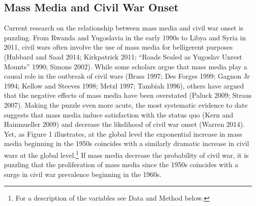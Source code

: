 \documentclass[12pt,article,oneside]{memoir}
\author{}
\date{}
\begin{document}
  
\setsansfont[Mapping=tex-text]{Gill Sans} 
\setmonofont[Mapping=tex-text,Scale=0.8]{Consolas}
\pagestyle{kjh}

\begin{centering}

\section{Mass Media and Civil War Onset}

\end{centering}

\vspace{2em}

\doublespacing

Current research on the relationship between mass media and civil war
onset is puzzling. From Rwanda and Yugoslavia in the early 1990s to
Libya and Syria in 2011, civil wars often involve the use of mass media
for belligerent purposes (Hubbard and Saad 2014; Kirkpatrick 2011;
``Roads Sealed as Yugoslav Unrest Mounts'' 1990; Simons 2002). While
some scholars argue that mass media play a causal role in the outbreak
of civil wars (Brass 1997; Des Forges 1999; Gagnon Jr 1994; Kellow and
Steeves 1998; Metzl 1997; Tambiah 1996), others have argued that the
negative effects of mass media have been overstated (Paluck 2009; Straus
2007). Making the puzzle even more acute, the most systematic evidence
to date suggests that mass media induce satisfaction with the status quo
(Kern and Hainmueller 2009) and decrease the likelihood of civil war
onset (Warren 2014). Yet, as Figure 1 illustrates, at the global level
the exponential increase in mass media beginning in the 1950s coincides
with a similarly dramatic increase in civil wars at the global
level.\footnote{For a description of the variables see Data and Method
  below.} If mass media decrease the probability of civil war, it is
puzzling that the proliferation of mass media since the 1950s coincides
with a surge in civil war prevalence beginning in the 1960s.
\end{document}

